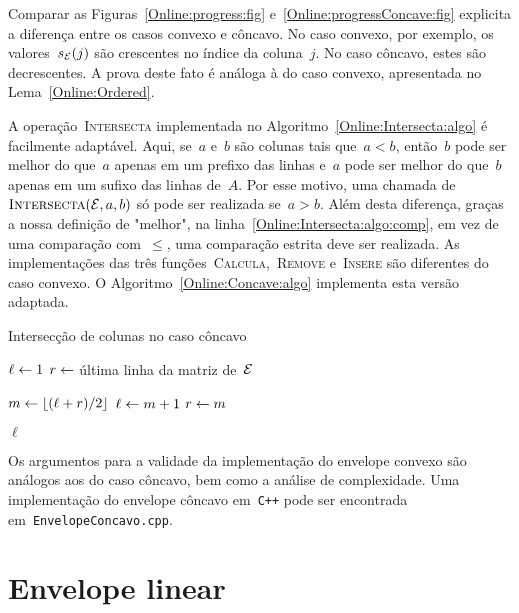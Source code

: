 Comparar as Figuras~\ref{Online:progress:fig} e~\ref{Online:progressConcave:fig} explicita a diferença entre os casos convexo e côncavo. No caso convexo, por exemplo, os valores~$s_{\mathcal{E}}(j)$ são crescentes no índice da coluna~$j$. No caso côncavo, estes são decrescentes. A prova deste fato é análoga à do caso convexo, apresentada no Lema~\ref{Online:Ordered}.

A operação~\textsc{Intersecta} implementada no Algoritmo~\ref{Online:Intersecta:algo} é facilmente adaptável. Aqui, se~$a$ e~$b$ são colunas tais que~$a < b$, então~$b$ pode ser melhor do que~$a$ apenas em um prefixo das linhas e~$a$ pode ser melhor do que~$b$ apenas em um sufixo das linhas de~$A$. Por esse motivo, uma chamada de~$\textsc{Intersecta}(\mathcal{E},a,b)$ só pode ser realizada se~$a > b$. Além desta diferença, graças a nossa definição de "melhor", na linha~\ref{Online:Intersecta:algo:comp}, em vez de uma comparação com~$\leq$, uma comparação estrita deve ser realizada. As implementações das três funções~\textsc{Calcula},~\textsc{Remove} e~\textsc{Insere} são diferentes do caso convexo. O Algoritmo~\ref{Online:Concave:algo} implementa esta versão adaptada.

\begin{algorithm}[h]
\caption{Intersecção de colunas no caso côncavo}
\label{Online:Intersecta:algo}
\begin{algorithmic}[1]
 
    \State $\ell \leftarrow 1$
    \State $r \leftarrow $ última linha da matriz de~$\mathcal{E}$

        \State $m \leftarrow \lfloor(\ell+r)/2\rfloor$
         \label{Online:Intersecta:algo:comp} 
            \State $\ell \leftarrow m + 1$
        \Else
            \State $r \leftarrow m$
        \EndIf
    \EndWhile

    \State \Return $\ell$
\EndFunction
\end{algorithmic}
\end{algorithm}

Os argumentos para a validade da implementação do envelope convexo são análogos aos do caso côncavo, bem como a análise de complexidade. Uma implementação do envelope côncavo em~\texttt{C++} pode ser encontrada em~\texttt{EnvelopeConcavo.cpp}.


\section{Envelope linear} \label{Online:linear}

